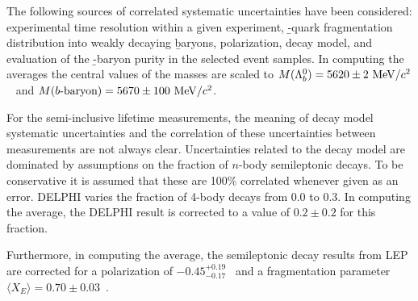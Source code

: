 The following sources of correlated systematic uncertainties have 
been considered:
experimental time resolution within a given experiment, \b-quark
fragmentation distribution into weakly decaying \b baryons,
\Lb polarization, decay model,
and evaluation of the \b-baryon purity in the selected event samples.
In computing the averages
the central values of the masses are scaled to 
$M(\Lambda_b^0) = 5620 \pm 2~\rm MeV/\mbox{$c$}^2$~\cite{Acosta:2005mq} and
$M(\mbox{\b-baryon}) = 5670 \pm 100\MeVcc$.

For the semi-inclusive lifetime measurements, 
the meaning of decay model
systematic uncertainties
and the correlation of these uncertainties between measurements
are not always clear.
Uncertainties related to the decay model are dominated by
assumptions on the fraction of $n$-body semileptonic decays.
To be conservative it is assumed
that these are 100\%  correlated whenever given as an error.
DELPHI varies the fraction of 4-body decays from 0.0 to 0.3. 
In computing the average, the DELPHI
result is corrected to a value of  $0.2 \pm 0.2$ for this fraction.

Furthermore, in computing the average,
the semileptonic decay results from LEP are corrected for a polarization of 
$-0.45^{+0.19}_{-0.17}$~\cite{Abbaneo:2000ej_mod,*Abbaneo:2001bv_mod_cont} and  a 
\Lb fragmentation parameter
$\langle X_E \rangle =0.70\pm 0.03$~\cite{Buskulic:1995mf}.




